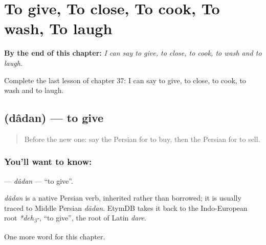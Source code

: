 
\chapter{To give, To close, To cook, To wash, To laugh}
\label{ch:fa-to-give-to-close-to-cook-to-wash-to-laugh}

\begin{chapteropening}
\textbf{By the end of this chapter:} \emph{I can say to give, to close, to cook, to wash and to laugh.}

Complete the last lesson of chapter 37: I can say to give, to close, to cook, to wash and to laugh.
\end{chapteropening}

\section[\texorpdfstring{\fa{دادن} (dâdan)}{دادن (dâdan)}]{ (dâdan) — to give}

\label{lesson:FA-C37-dadan}



\begin{quote}
Before the new one: say the Persian for to buy, then the Persian for to sell.
\end{quote}

\subsection*{You'll want to know: }
\textbf{} — \emph{dâdan} — \textquotedblleft{}to give\textquotedblright{}.

\begin{cousinweb}
\emph{dâdan} is a native Persian verb, inherited rather than borrowed; it is usually traced to Middle Persian \emph{dādan}. EtymDB takes it back to the Indo-European root \emph{*deh\textsubscript{3}-}, \textquotedblleft{}to give\textquotedblright{}, the root of Latin \emph{dare}.
\end{cousinweb}

\begin{grammarlens}[title={What you've built}]
One more word for this chapter.
\end{grammarlens}

